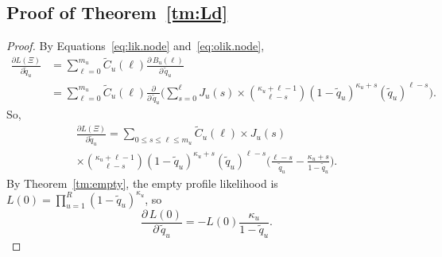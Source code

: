\documentclass{elsarticle}
\newcommand{\nlik}{C}
\newcommand{\nolik}{B}
\newcommand{\solik}{J}
\newcommand{\nx}{u}
\begin{document}
\subsection{Proof of Theorem~\ref{tm:Ld}}
\begin{proof}\small
By Equations~\eqref{eq:lik.node} and~\eqref{eq:olik.node},
\begin{align*}
\frac{\partial L(\Xi)}{\partial \tilde{q}_{\nx}}
& = \sum_{\ell=0}^{m_{\nx}} \tilde{\nlik}_{\nx}(\ell)\frac{\partial\, \nolik_{\nx}(\ell)}{\partial\, \tilde{q}_{\nx}}
 \\
 & =\sum_{\ell=0}^{m_{\nx}} \tilde{\nlik}_{\nx}(\ell) 
 	\frac{\partial}{\partial\,\tilde{q}_{\nx}}
 	\biggl(\sum_{s=0}^{\ell} \solik_{\nx}(s) \times \binom{\kappa_{\nx}+\ell-1}{\ell-s} (1-\tilde{q}_{\nx})^{\kappa_{\nx}+s} (\tilde{q}_{\nx})^{\ell-s}\biggr).
\end{align*}
So, 
\begin{multline}
\frac{\partial L(\Xi)}{\partial \tilde{q}_{\nx}}
= \sum_{0\le s\le \ell\le m_{\nx}} 
 \tilde{\nlik}_{\nx}(\ell) \times \solik_{\nx}(s) 
 \\ %
 	\times \binom{\kappa_{\nx}+\ell-1}{\ell-s} (1-\tilde{q}_{\nx})^{\kappa_{\nx}+s}(\tilde{q}_{\nx})^{\ell-s}
 	\biggl(\frac{\ell-s}{\tilde{q}_{\nx}}-\frac{\kappa_{\nx}+s}{1-\tilde{q}_{\nx}}\biggr).
\end{multline}
By Theorem~\ref{tm:empty}, the empty profile likelihood is 
$L(0)=\prod_{\nx=1}^R (1-\tilde{q}_{\nx})^{\kappa_{\nx}}$, so 
\[
\frac{\partial\,L(0)}{\partial\,\tilde{q}_{\nx}}
= -L(0) \frac{\kappa_{\nx}}{1-\tilde{q}_{\nx}}.
\]


\end{proof}
\end{document}
